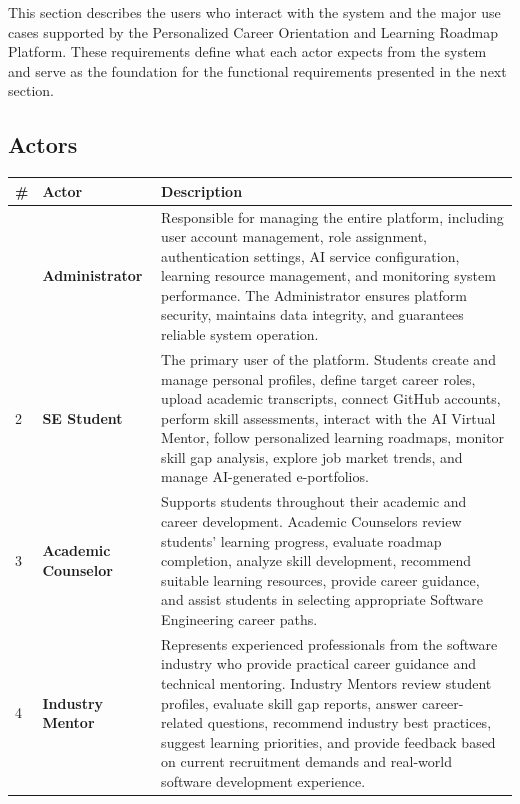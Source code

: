 This section describes the users who interact with the system and the major use cases supported by the Personalized Career Orientation and Learning Roadmap Platform. These requirements define what each actor expects from the system and serve as the foundation for the functional requirements presented in the next section.

\subsection{Actors}

\renewcommand{\arraystretch}{1.5}

\begin{longtable}{|>{\centering\arraybackslash}p{0.8cm}|>{\centering\arraybackslash}p{3.5cm}|p{10cm}|}
\hline
\rowcolor[HTML]{F4D7D7}
\textbf{\#} & \textbf{Actor} & \textbf{Description} \\
\hline
\endfirsthead
\hline
\endhead

1 &
\textbf{Administrator}
&
Responsible for managing the entire platform, including user account management, role assignment, authentication settings, AI service configuration, learning resource management, and monitoring system performance. The Administrator ensures platform security, maintains data integrity, and guarantees reliable system operation.
\\
\hline

2 &
\textbf{SE Student}
&
The primary user of the platform. Students create and manage personal profiles, define target career roles, upload academic transcripts, connect GitHub accounts, perform skill assessments, interact with the AI Virtual Mentor, follow personalized learning roadmaps, monitor skill gap analysis, explore job market trends, and manage AI-generated e-portfolios.
\\
\hline

3 &
\textbf{Academic Counselor}
&
Supports students throughout their academic and career development. Academic Counselors review students' learning progress, evaluate roadmap completion, analyze skill development, recommend suitable learning resources, provide career guidance, and assist students in selecting appropriate Software Engineering career paths.
\\
\hline

4 &
\textbf{Industry Mentor}
&
Represents experienced professionals from the software industry who provide practical career guidance and technical mentoring. Industry Mentors review student profiles, evaluate skill gap reports, answer career-related questions, recommend industry best practices, suggest learning priorities, and provide feedback based on current recruitment demands and real-world software development experience.
\\
\hline

\end{longtable}

